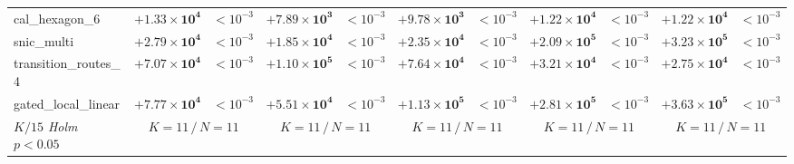 \begin{tabular}{@{}l rr rr rr rr rr@{}}
cal\_hexagon\_6 & $\mathbf{+1.33{\times}10^{4}}$ & $<\!10^{-3}$ & $\mathbf{+7.89{\times}10^{3}}$ & $<\!10^{-3}$ & $\mathbf{+9.78{\times}10^{3}}$ & $<\!10^{-3}$ & $\mathbf{+1.22{\times}10^{4}}$ & $<\!10^{-3}$ & $\mathbf{+1.22{\times}10^{4}}$ & $<\!10^{-3}$ \\
snic\_multi & $\mathbf{+2.79{\times}10^{4}}$ & $<\!10^{-3}$ & $\mathbf{+1.85{\times}10^{4}}$ & $<\!10^{-3}$ & $\mathbf{+2.35{\times}10^{4}}$ & $<\!10^{-3}$ & $\mathbf{+2.09{\times}10^{5}}$ & $<\!10^{-3}$ & $\mathbf{+3.23{\times}10^{5}}$ & $<\!10^{-3}$ \\
transition\_routes\_4 & $\mathbf{+7.07{\times}10^{4}}$ & $<\!10^{-3}$ & $\mathbf{+1.10{\times}10^{5}}$ & $<\!10^{-3}$ & $\mathbf{+7.64{\times}10^{4}}$ & $<\!10^{-3}$ & $\mathbf{+3.21{\times}10^{4}}$ & $<\!10^{-3}$ & $\mathbf{+2.75{\times}10^{4}}$ & $<\!10^{-3}$ \\
gated\_local\_linear & $\mathbf{+7.77{\times}10^{4}}$ & $<\!10^{-3}$ & $\mathbf{+5.51{\times}10^{4}}$ & $<\!10^{-3}$ & $\mathbf{+1.13{\times}10^{5}}$ & $<\!10^{-3}$ & $\mathbf{+2.81{\times}10^{5}}$ & $<\!10^{-3}$ & $\mathbf{+3.63{\times}10^{5}}$ & $<\!10^{-3}$ \\
\midrule
\emph{$K/15$ Holm $p<0.05$} & \multicolumn{2}{c}{$K{=}11\,/\,N{=}11$} & \multicolumn{2}{c}{$K{=}11\,/\,N{=}11$} & \multicolumn{2}{c}{$K{=}11\,/\,N{=}11$} & \multicolumn{2}{c}{$K{=}11\,/\,N{=}11$} & \multicolumn{2}{c}{$K{=}11\,/\,N{=}11$} \\
\bottomrule
\end{tabular}